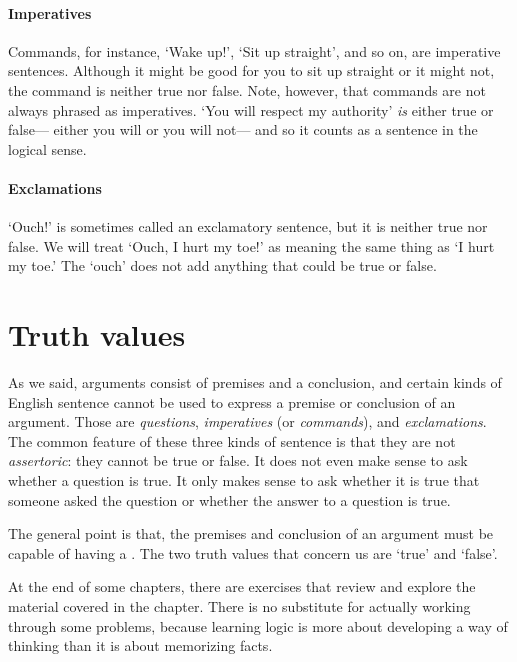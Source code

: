 \paragraph{Imperatives} Commands, for instance, `Wake up!', `Sit up straight', and so on, are imperative sentences. Although it might be good for you to sit up straight or it might not, the command is neither true nor false. Note, however, that commands are not always phrased as imperatives. `You will respect my authority' \emph{is} either true or false--- either you will or you will not--- and so it counts as a sentence in the logical sense.

\paragraph{Exclamations} `Ouch!' is sometimes called an exclamatory sentence, but it is neither true nor false. We will treat `Ouch, I hurt my toe!' as meaning the same thing as `I hurt my toe.' The `ouch' does not add anything that could be true or false.


\section{Truth values}
As we said, arguments consist of premises and a conclusion, and certain kinds of English sentence cannot be used to express a premise or conclusion of an argument. Those are \textit{questions}, \textit{imperatives} (or \textit{commands}), and \textit{exclamations}. The common feature of these three kinds of sentence is that they are not \emph{assertoric}: they cannot be true or false. It does not even make sense to ask whether a question is true. It only makes sense to ask whether it is true that someone asked the question or whether the answer to a question is true.

The general point is that, the premises and conclusion of an argument must be capable of having a . The two truth values that concern us are `true' and `false'. 


\practiceproblems
At the end of some chapters, there are exercises that review and explore the material covered in the chapter. There is no substitute for actually working through some problems, because learning logic is more about developing a way of thinking than it is about memorizing facts.

\medskip

